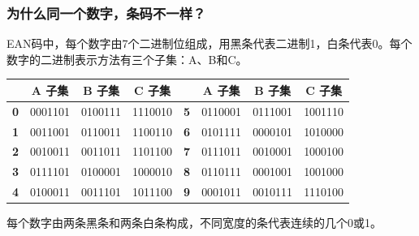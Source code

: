 \begin{frame}
    \frametitle{为什么同一个数字，条码不一样？}
    \qquad EAN码中，每个数字由7个二进制位组成，用黑条代表二进制1，白条代表0。每个数字的二进制表示方法有三个子集：A、B和C。    
\begin{table}[]
    \begin{tabular}{@{}cccccccc@{}}
    \toprule
               & \textbf{A 子集} & \textbf{B 子集} & \textbf{C 子集} & \textbf{}  & \textbf{A 子集} & \textbf{B 子集} & \textbf{C 子集} \\ \midrule
    \textbf{0} & 0001101       & 0100111       & 1110010       & \qquad \textbf{5} & 0110001       & 0111001       & 1001110       \\
    \textbf{1} & 0011001       & 0110011       & 1100110       & \qquad \textbf{6} & 0101111       & 0000101       & 1010000       \\
    \textbf{2} & 0010011       & 0011011       & 1101100       & \qquad \textbf{7} & 0111011       & 0010001       & 1000100       \\
    \textbf{3} & 0111101       & 0100001       & 1000010       & \qquad \textbf{8} & 0110111       & 0001001       & 1001000       \\
    \textbf{4} & 0100011       & 0011101       & 1011100       & \qquad \textbf{9} & 0001011       & 0010111       & 1110100       \\ \bottomrule
    \end{tabular}
    \end{table}
    \qquad 每个数字由两条黑条和两条白条构成，不同宽度的条代表连续的几个0或1。
\end{frame}

